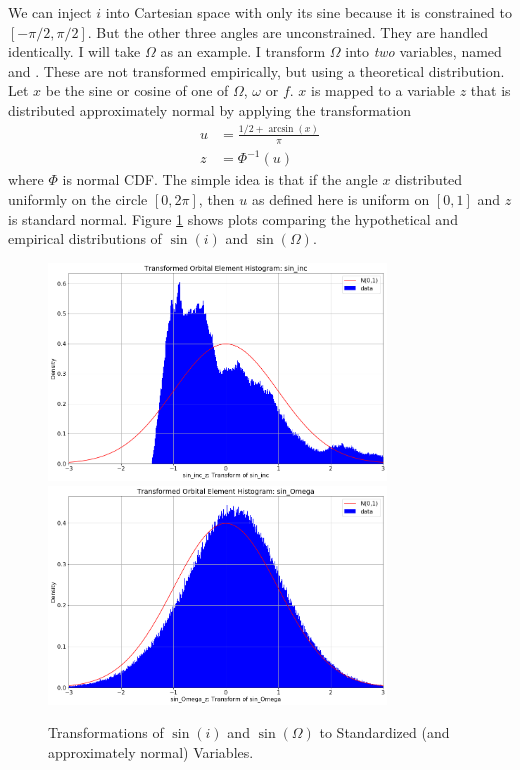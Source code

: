 We can inject $i$ into Cartesian space with only its sine because it is constrained to $[-\pi/2, \pi/2]$.
But the other three angles are unconstrained.  
They are handled identically.
I will take $\Omega$ as an example.
I transform $\Omega$ into \textit{two} variables, named  and .
These are not transformed empirically, but using a theoretical distribution.
Let $x$ be the sine or cosine of one of $\Omega$, $\omega$ or $f$.
$x$ is mapped to a variable $z$ that is distributed approximately normal by applying the transformation
\begin{align*}
u &= \frac{1/2 + \arcsin(x)}{\pi} \\
z &= \Phi^{-1}(u)
\end{align*}
where $\Phi$ is normal CDF.
The simple idea is that if the angle $x$ distributed uniformly on the circle $[0, 2 \pi]$, 
then $u$ as defined here is uniform on $[0,1]$ and $z$ is standard normal.
Figure \ref{fig:elt_standardize_inc_omega} shows plots comparing the hypothetical and empirical distributions of $\sin(i)$ and $\sin(\Omega)$.
\begin{figure}[hbt!]
\begin{center}
\includegraphics[width=0.8\textwidth]{../figs/elts_cov/sin_inc_z.png}
\includegraphics[width=0.8\textwidth]{../figs/elts_cov/sin_Omega_z.png}
\end{center}
\caption[Transformations of $\sin(i)$ and $\sin(\Omega)$ to Standardized Variables.]
{Transformations of $\sin(i)$ and $\sin(\Omega)$ to Standardized (and approximately normal) Variables.}
\label{fig:elt_standardize_inc_omega}
\end{figure}
